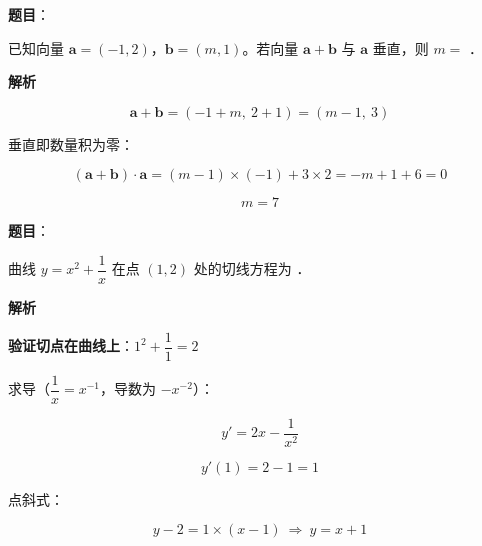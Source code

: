 \begin{answer}

\textbf{题目}：

已知向量 $\boldsymbol a=(-1,2)$，$\boldsymbol b=(m,1)$。若向量 $\boldsymbol a+\boldsymbol b$ 与 $\boldsymbol a$ 垂直，则 $m=$ \gkblank{}．

\textbf{解析}

\nopagebreak[4]
\[\boldsymbol a+\boldsymbol b=(-1+m,\ 2+1)=(m-1,\ 3)\]

垂直即数量积为零：

\nopagebreak[4]
\[(\boldsymbol a+\boldsymbol b)\cdot\boldsymbol a=(m-1)\times(-1)+3\times2=-m+1+6=0\]

\nopagebreak[4]
\[m=7\]


\par\medskip

\end{answer}
\begin{answer}

\textbf{题目}：

曲线 $y=x^{2}+\dfrac1x$ 在点 $(1,2)$ 处的切线方程为 \gkblank{}．

\textbf{解析}

\textbf{验证切点在曲线上}：$1^{2}+\dfrac11=2$ 

求导（$\dfrac1x=x^{-1}$，导数为 $-x^{-2}$）：

\nopagebreak[4]
\[y'=2x-\frac1{x^{2}}\]

\nopagebreak[4]
\[y'(1)=2-1=1\]

点斜式：

\nopagebreak[4]
\[y-2=1\times(x-1)\ \Longrightarrow\ y=x+1\]


\par\medskip

\end{answer}
